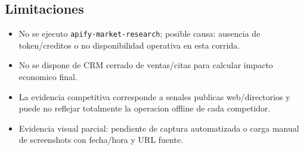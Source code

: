 \documentclass[9pt,a4paper,twocolumn,twoside]{tau-class/tau}
\begin{document}
\subsection{Limitaciones}
\begin{itemize}
  \item No se ejecuto \texttt{apify-market-research}; posible causa: ausencia de token/creditos o no disponibilidad operativa en esta corrida.
  \item No se dispone de CRM cerrado de ventas/citas para calcular impacto economico final.
  \item La evidencia competitiva corresponde a senales publicas web/directorios y puede no reflejar totalmente la operacion offline de cada competidor.
  \item Evidencia visual parcial: pendiente de captura automatizada o carga manual de screenshots con fecha/hora y URL fuente.
\end{itemize}
\end{document}
